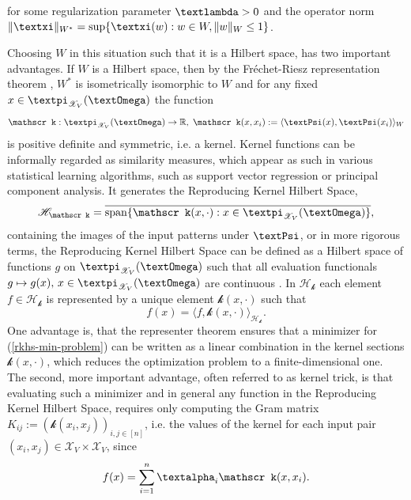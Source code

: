 \documentclass[openany]{book}
\begin{document}
for some regularization parameter $\glambda >0$ and the operator norm $\|\gxi\|_{W^\ast}=\sup \{\gxi(w):w\in W, \|w\|_W\leq 1\}$.
\par Choosing $W$ in this situation such that it is a Hilbert space, has two important advantages. If $W$ is a Hilbert space, then by the Fréchet-Riesz representation theorem \cite{clason2020}, $W^\ast$ is isometrically isomorphic to $W$ and for any fixed $x\in\gpi_{\mathscr X_V}(\gOmega)$ the function
\begin{equation*}
    \mathscr k:\gpi_{\mathscr X_V}(\gOmega)\to \mathbb R,\; \mathscr k(x,x_i):=\langle \gPsi(x), \gPsi(x_i)\rangle_W
\end{equation*}
is positive definite and symmetric, i.e. a kernel. Kernel functions can be informally regarded as similarity measures, which appear as such in various statistical learning algorithms, such as support vector regression or principal component analysis. It generates the Reproducing Kernel Hilbert Space, 
\begin{equation*}
    \mathscr H_{\mathscr k}=\overline{\spanLA\{\mathscr k(x,\cdot):x\in \gpi_{\mathscr X_V}(\gOmega)\}},
\end{equation*}
containing the images of the input
patterns under $\gPsi$, or in more rigorous terms, the Reproducing Kernel Hilbert Space can be defined as a Hilbert space of functions $g$ on $\gpi_{\mathscr X_V}(\gOmega)$ such that all evaluation functionals $g\mapsto g(x),\,x\in \gpi_{\mathscr X_V}(\gOmega)$ are
continuous \cite{schoelkopf2001book}. In $\mathscr H_{\mathscr k}$ each element $f\in \mathscr H_{\mathscr k}$ is represented by a unique element $\mathscr k(x,\cdot)$ such that 
\begin{equation*}
    f(x)=\langle f, \mathscr k(x, \cdot)\rangle_{\mathscr H_{\mathscr k}}.
\end{equation*}
One advantage is, that the representer theorem \cite{schoelkopf2001} ensures that a minimizer for (\ref{rkhs-min-problem}) can be written as a linear combination in the kernel sections $\mathscr k(x,\cdot)$, which reduces the optimization problem to a finite-dimensional one. The second, more important advantage, often referred to as kernel trick, is that evaluating such a minimizer and in general any function in the Reproducing Kernel Hilbert Space, requires only computing the Gram matrix $K_{ij}:=(\mathscr k(x_i,x_j))_{i,j\in [n]}$, i.e. the values of the kernel for each input pair $(x_i,x_j)\in \mathscr X_V\times \mathscr X_V$, since
\begin{equation}\label{kernel-eval}
    f(x)=\sum_{i=1}^n\galpha_i\mathscr k(x,x_i).
\end{equation}
\end{document}
